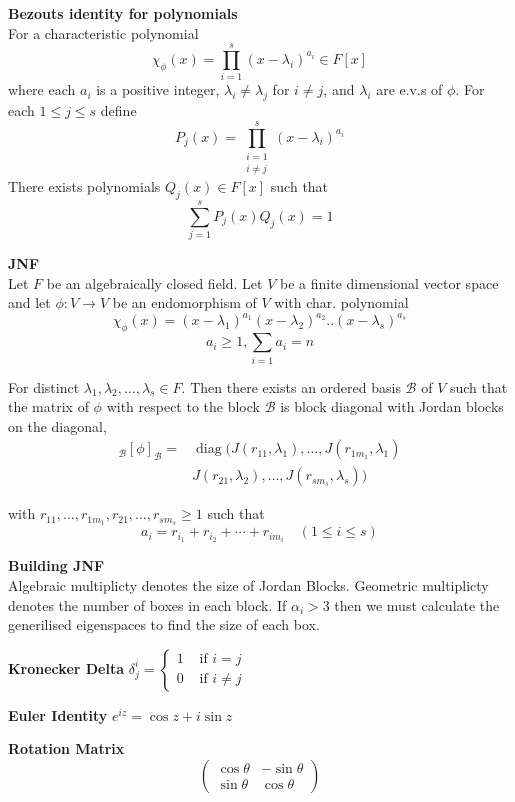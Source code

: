 \documentclass[a4paper, 10pt]{article}
\begin{document}
\begin{multicols*}{3}
\textbf{Bezouts identity for polynomials}\\
For a characteristic polynomial
$$
\chi_\phi(x)=\prod_{i=1}^s\left(x-\lambda_i\right)^{a_i} \in F[x]
$$
where each $a_i$ is a positive integer, $\lambda_i \neq \lambda_j$ for $i \neq j$, and $\lambda_i$ are e.v.s of $\phi$. For each $1 \leq j \leq s$ define
$$
P_j(x)=\prod_{\substack{i=1 \\ i \neq j}}^s\left(x-\lambda_i\right)^{a_i}
$$
There exists polynomials $Q_j(x) \in F[x]$ such that
$$
\sum_{j=1}^s P_j(x) Q_j(x)=1
$$

\textbf{JNF}\\
Let $F$ be an algebraically closed field. Let $V$ be a finite dimensional vector space and let $\phi: V \rightarrow V$ be an endomorphism of $V$ with char. polynomial
$$
\chi_\phi(x)=\left(x-\lambda_1\right)^{a_1}\left(x-\lambda_2\right)^{a_2} . .\left(x-\lambda_s\right)^{a_s}$$
$$
a_i \geq 1, \sum_{i=1} a_i=n
$$

For distinct $\lambda_1, \lambda_2, \ldots, \lambda_s \in F$. Then there exists an ordered basis $\mathcal{B}$ of $V$ such that the matrix of $\phi$ with respect to the block $\mathcal{B}$ is block diagonal with Jordan blocks on the diagonal, 
\begin{align*}
{ }_\mathcal{B}[\phi]_{\mathcal{B}}=&\operatorname{diag}(J(r_{11}, \lambda_1), \ldots, J(r_{1 m_1}, \lambda_1)\\
&J(r_{21}, \lambda_2), \ldots, J(r_{s m_s}, \lambda_s))
\end{align*}

with $r_{11}, \ldots, r_{1 m_1}, r_{21}, \ldots, r_{s m_s} \geq 1$ such that
$$
a_i=r_{i_1}+r_{i_2}+\cdots+r_{i m_i} \quad(1 \leq i \leq s)
$$

\textbf{Building JNF}\\
Algebraic multiplicty denotes the size of Jordan Blocks. 
Geometric multiplicty denotes the number of boxes in each block. If $\alpha_i>3$ then we must calculate the generilised eigenspaces to find the size of each box. 

\textbf{Kronecker Delta}
$\delta_j^i= \begin{cases}1 & \text { if } i=j \\ 0 & \text { if } i \neq j\end{cases}$

\textbf{Euler Identity}
$e^{iz} = \cos z + i \sin z$

\textbf{Rotation Matrix}
$$
\left(
\begin{array}{cc}
    \cos \theta & -\sin \theta \\
    \sin \theta & \cos \theta
\end{array}
\right)
$$


\end{multicols*}
\end{document}

